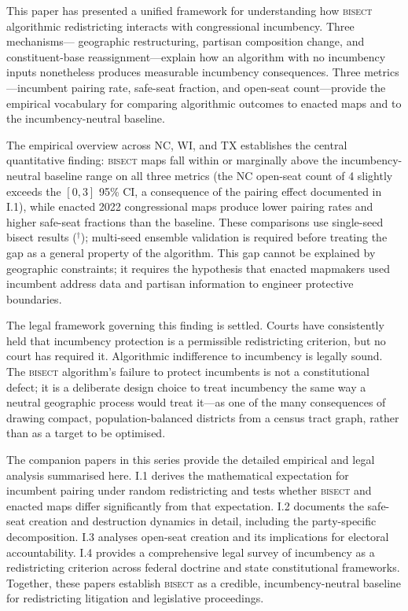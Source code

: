\label{sec:conclusion}

This paper has presented a unified framework for understanding how \textsc{bisect}
algorithmic redistricting interacts with congressional incumbency. Three mechanisms---
geographic restructuring, partisan composition change, and constituent-base
reassignment---explain how an algorithm with no incumbency inputs nonetheless produces
measurable incumbency consequences. Three metrics---incumbent pairing rate, safe-seat
fraction, and open-seat count---provide the empirical vocabulary for comparing algorithmic
outcomes to enacted maps and to the incumbency-neutral baseline.

The empirical overview across NC, WI, and TX establishes the central quantitative
finding: \textsc{bisect} maps fall within or marginally above the incumbency-neutral
baseline range on all three metrics (the NC open-seat count of 4 slightly exceeds the
$[0,3]$ 95\% CI, a consequence of the pairing effect documented in I.1), while enacted
2022 congressional maps produce lower pairing rates and higher safe-seat fractions than
the baseline. These comparisons use single-seed bisect results ($^\dagger$); multi-seed
ensemble validation is required before treating the gap as a general property of the
algorithm. This gap cannot be explained by
geographic constraints; it requires the hypothesis that enacted mapmakers used incumbent
address data and partisan information to engineer protective boundaries.

The legal framework governing this finding is settled. Courts have consistently held
that incumbency protection is a permissible redistricting criterion, but no court has
required it. Algorithmic indifference to incumbency is legally sound. The \textsc{bisect}
algorithm's failure to protect incumbents is not a constitutional defect; it is a
deliberate design choice to treat incumbency the same way a neutral geographic process
would treat it---as one of the many consequences of drawing compact, population-balanced
districts from a census tract graph, rather than as a target to be optimised.

The companion papers in this series provide the detailed empirical and legal analysis
summarised here. I.1 derives the mathematical expectation for incumbent pairing under
random redistricting and tests whether \textsc{bisect} and enacted maps differ
significantly from that expectation. I.2 documents the safe-seat creation and destruction
dynamics in detail, including the party-specific decomposition. I.3 analyses open-seat
creation and its implications for electoral accountability. I.4 provides a comprehensive
legal survey of incumbency as a redistricting criterion across federal doctrine and state
constitutional frameworks. Together, these papers establish \textsc{bisect} as a
credible, incumbency-neutral baseline for redistricting litigation and legislative
proceedings.
